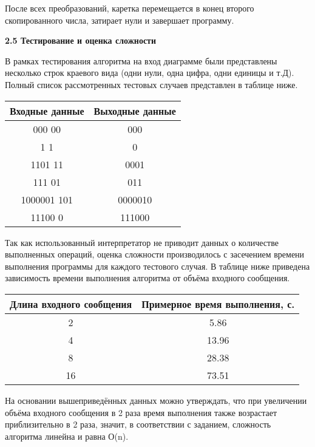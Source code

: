 \documentclass{article}
\begin{document}
\par После всех преобразований, каретка перемещается в конец второго скопированного числа, затирает нули и завершает программу.\\

\par \textbf{2.5 Тестирование и оценка сложности}\\
\par В рамках тестирования алгоритма на вход диаграмме были представлены несколько строк краевого вида (одни нули, одна цифра, одни единицы и т.Д). Полный список рассмотренных тестовых случаев представлен в таблице ниже.


\begin{center}
\begin{tabular}{|c|c|}
    \hline
    Входные данные & Выходные данные \\
    \hline
    000 00  & 000 \\
    \hline
    1 1 & 0  \\
    \hline
    1101 11 & 0001\\
    \hline
    111 01 & 011 \\
    \hline
    1000001 101 & 0000010 \\
    \hline
    11100 0&  111000 \\
    \hline
\end{tabular}
\end{center}

Так как использованный интерпретатор не приводит данных о количестве выполненных операций, оценка сложности производилось с засечением времени выполнения программы для каждого тестового случая. В таблице ниже приведена зависимость времени выполнения алгоритма от объёма входного сообщения.

\begin{center}
\begin{tabular}{|c|c|}
    \hline
    Длина входного сообщения & Примерное время выполнения, с. \\
    \hline
    2  & 5.86 \\
    \hline
    4 & 13.96  \\
    \hline
    8 & 28.38\\
    \hline
    16 & 73.51 \\
    \hline
\end{tabular}
\end{center}

На основании вышеприведённых данных можно утверждать, что при увеличении объёма входного сообщения в 2 раза время выполнения также возрастает приблизительно в 2 раза, значит, в соответствии с заданием, сложность алгоритма линейна и равна О(n).\\
\end{document}
